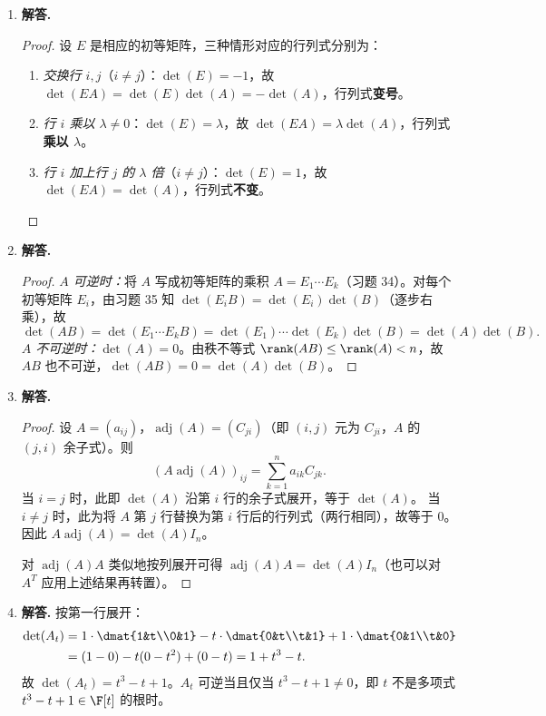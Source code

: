 \begin{enumerate}[label=\textbf{\arabic*.}, leftmargin=*, itemsep=1em]
  \item \textbf{解答.}
  \begin{proof}
  设 $E$ 是相应的初等矩阵，三种情形对应的行列式分别为：
  \begin{enumerate}[label=(\roman*)]
    \item \emph{交换行 $i,j$}（$i\ne j$）：$\det(E)=-1$，故 $\det(EA)=\det(E)\det(A)=-\det(A)$，行列式\textbf{变号}。
    \item \emph{行 $i$ 乘以 $\lambda\ne0$}：$\det(E)=\lambda$，故 $\det(EA)=\lambda\det(A)$，行列式\textbf{乘以 $\lambda$}。
    \item \emph{行 $i$ 加上行 $j$ 的 $\lambda$ 倍}（$i\ne j$）：$\det(E)=1$，故 $\det(EA)=\det(A)$，行列式\textbf{不变}。
  \end{enumerate}
  \end{proof}

  \item \textbf{解答.}
  \begin{proof}
  \emph{$A$ 可逆时：}将 $A$ 写成初等矩阵的乘积 $A=E_1\cdots E_k$（习题 34）。对每个初等矩阵 $E_i$，由习题 35 知 $\det(E_i B)=\det(E_i)\det(B)$（逐步右乘），故
  \[
    \det(AB)=\det(E_1\cdots E_k B)=\det(E_1)\cdots\det(E_k)\det(B)=\det(A)\det(B).
  \]
  \emph{$A$ 不可逆时：}$\det(A)=0$。由秩不等式 $\rank(AB)\le\rank(A)<n$，故 $AB$ 也不可逆，$\det(AB)=0=\det(A)\det(B)$。
  \end{proof}

  \item \textbf{解答.}
  \begin{proof}
  设 $A=(a_{ij})$，$\operatorname{adj}(A)=(C_{ji})$（即 $(i,j)$ 元为 $C_{ji}$，$A$ 的 $(j,i)$ 余子式）。则
  \[
    (A\operatorname{adj}(A))_{ij} = \sum_{k=1}^n a_{ik}C_{jk}.
  \]
  当 $i=j$ 时，此即 $\det(A)$ 沿第 $i$ 行的余子式展开，等于 $\det(A)$。
  当 $i\ne j$ 时，此为将 $A$ 第 $j$ 行替换为第 $i$ 行后的行列式（两行相同），故等于 $0$。
  因此 $A\operatorname{adj}(A)=\det(A)I_n$。
  
  对 $\operatorname{adj}(A)A$ 类似地按列展开可得 $\operatorname{adj}(A)A=\det(A)I_n$（也可以对 $A^T$ 应用上述结果再转置）。
  \end{proof}

  \item \textbf{解答.}
  按第一行展开：
  \begin{align*}
    \det(A_t)
    &= 1\cdot\dmat{1&t\\0&1} - t\cdot\dmat{0&t\\t&1} + 1\cdot\dmat{0&1\\t&0}\\
    &= (1-0) - t(0-t^2) + (0-t) = 1+t^3-t.
  \end{align*}
  故 $\det(A_t)=t^3-t+1$。$A_t$ 可逆当且仅当 $t^3-t+1\ne0$，即 $t$ 不是多项式 $t^3-t+1\in\F[t]$ 的根时。


\end{enumerate}

